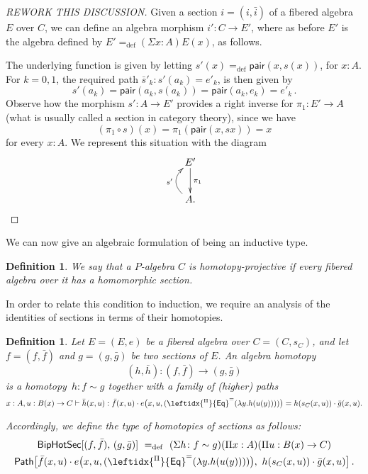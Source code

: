 \documentclass[10pt,a4paper,oneside,reqno]{amsart}
\numberwithin{equation}{section}
\theoremstyle{mythm}
\theoremstyle{mydef}
\newtheorem{definition}[theorem]{Definition}
\theoremstyle{myrmk}
\newcommand{\ie}{\text{i.e.\ }}
\newcommand{\defeq}{=_{\mathrm{def}}}
\newcommand{\co}{\colon}
\newcommand{\ct}{\cdot}
\newcommand{\funext}{\leftidx{^\Pi}{\mathsf{Eq}}^{=}}
\newcommand{\pair}{\mathsf{pair}}
\newcommand{\Id}{\mathsf{Path}}
\newcommand{\HoSec}{\mathsf{BipHotSec}}
\begin{document}
\begin{proof}
[REWORK THIS DISCUSSION]
Given a section $i = (i, \bar{i})$ of a fibered algebra $E$ over $C$, we can define an algebra morphism $i' \co C \to E'$, where as before $E'$ is the algebra defined by $E' \defeq (\Sigma x :A) E(x)$, as follows.

The underlying function is given by letting $s'(x) \defeq \pair(x, s(x))$, for $x : A$. For $k = 0, 1$, the required path $\bar{s}'_k \co s'(a_k) = e'_k$,
is then given by
\[
s'(a_k) = \pair(a_k, s(a_k)) =  \pair(a_k, e_k) = e'_k \, .
\]
Observe how the morphism $s' \co A \to E'$ provides a right inverse for $\pi_1 \co E' \to A$ (\ie what is usually called a section in 
category theory), since we have
\[
(\pi_1 \circ s)(x) = \pi_1 (\pair(x, sx)) = x 
\]
for every $x \co A$. We represent this situation with the diagram
\[
\xymatrix{
E' \ar[d]^{\pi_1} \\
A . \ar@/^1.2pc/[u]^{s'} }
\]
\end{proof}

We can now give an algebraic formulation of being an inductive type.

\begin{definition} We say that a $P$-algebra $C$ is \emph{homotopy-projective} if every fibered algebra over it has a homomorphic section.
\end{definition} 

In order to relate this condition to induction, we require an analysis of the identities of sections in terms of their homotopies.

\begin{definition} \label{def:W2cellsection} Let $E = (E, e)$ be a fibered algebra over $C = (C, s_C)$, and let $f = (f, \bar{f})$ and $g = (g, \bar{g})$ be two sections of $E$.  An \emph{algebra homotopy} 
\[
(h, \bar{h}) \co (f, \bar{f})  \rightarrow (g, \bar{g})
\] 
is a homotopy~$h\co f \sim g$ together with a family of (higher) paths 
\[
x : A, u : B(x) \to C \vdash \bar{h}(x,u) : 
\bar{f}(x,u)  \ct e\big(x,u,(\funext(\lambda{y}.h(u(y))))\big) = 
h(s_C(x,u)) \ct \bar{g}(x,u).
\]

Accordingly, we define the type of homotopies of sections as follows:
\begin{multline*}
\HoSec[ (f, \bar{f}) ,\, (g, \bar{g}) ]\ \defeq\ 
(\Sigma h \co f \sim g) (\Pi x : A)(\Pi u : B(x) \to C)\\
\Id\big[ \bar{f}(x,u)  \ct e\big(x,u,(\funext(\lambda{y}.h(u(y))))\big),\ 
h(s_C(x,u)) \ct \bar{g}(x,u) \big]\, .
\end{multline*}
\end{definition} 
\end{document}
